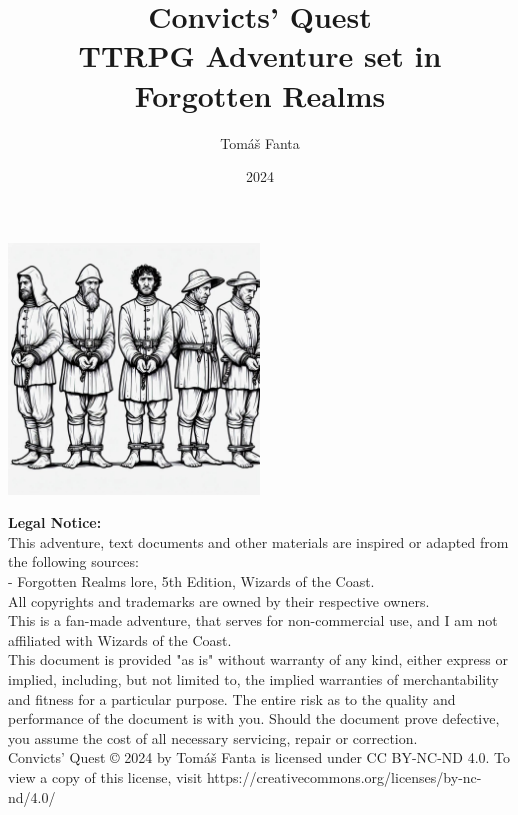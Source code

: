 \documentclass[10pt,twoside,twocolumn,openany,nodepracetedcode]{dndbook}
\title{Convicts' Quest \\
\large TTRPG Adventure set in Forgotten Realms}
\author{Tomáš Fanta}
\date{2024}
\begin{document}
\frontmatter

\makeatletter
\begin{titlepage}
  \centering
    \vspace{1.5cm}
    {\huge \@title \par}
    \vspace{1.5cm}
    {\Large \@author \par}
    \vspace{1.5cm}
    {\large \@date \par}
    \vspace{1.5cm}
    \includegraphics[width=0.5\textwidth]{img/title}
    \vfill
    \begin{flushleft}
      \footnotesize
      \textbf{Legal Notice:}\\
      This adventure, text documents and other materials are inspired or adapted from the following sources:\\
      - Forgotten Realms lore, 5th Edition, Wizards of the Coast.\\
      All copyrights and trademarks are owned by their respective owners.\\
      This is a fan-made adventure, that serves for non-commercial use, and I am not affiliated with Wizards of the Coast.\\
      This document is provided "as is" without warranty of any kind, either express or implied, including, but not limited to,
      the implied warranties of merchantability and fitness for a particular purpose. The entire risk as to the quality
      and performance of the document is with you. Should the document prove defective, you assume the cost of
      all necessary servicing, repair or correction.\\
      Convicts' Quest © 2024 by Tomáš Fanta is licensed under CC BY-NC-ND 4.0. To view a copy of this license, visit https://creativecommons.org/licenses/by-nc-nd/4.0/
    \end{flushleft}
\end{titlepage}
\makeatother
\end{document}
